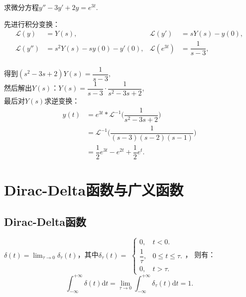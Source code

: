 \documentclass[openany,oneside]{ctexbook}
\begin{document}
\begin{example}
    求微分方程$y''-3y'+2y=e^{3t}$.
\end{example}
\begin{solution}
    先进行积分变换：
    \begin{align*}
        \mathcal{L}(y)&=Y(s),
        & \mathcal{L}(y')&=sY(s)-y(0),\\
        \mathcal{L}(y'')&=s^2Y(s)-sy(0)-y'(0),
        & \mathcal{L}(e^{3t})&=\dfrac{1}{s-3},
    \end{align*}\\
    得到$(s^2-3s+2)Y(s)=\dfrac{1}{s-3},$\\
    然后解出$Y(s)$：$Y(s)=\dfrac{1}{s-3}\cdot\dfrac{1}{s^2-3s+2}$,\\
    最后对$Y(s)$求逆变换：
    \begin{align*}
        y(t)&=e^{3t}*\mathcal{L}^{-1}\biggl(\dfrac{1}{s^2-3s+2}\biggr)\\
        &=\mathcal{L}^{-1}\biggl(\dfrac{1}{(s-3)(s-2)(s-1)}\biggr)\\
        &=\dfrac{1}{2}e^{3t}-e^{2t}+\dfrac{1}{2}e^t.
    \end{align*}
\end{solution}


\section{Dirac-Delta函数与广义函数}
\subsection{Dirac-Delta函数}
\begin{minipage}[t]{0.7\textwidth}
$\delta(t)=\lim_{\tau\to0}\delta_\tau(t)$，其中$\delta_\tau(t)=$
$\begin{cases}
    0, & t<0.\\
    \dfrac{1}{\tau}, & 0\leq t\leq\tau.\\
    0, & t>\tau.
\end{cases}$，
则有：
\[\displaystyle\int_{-\infty}^{+\infty}\delta(t)\mathrm{d}t=\lim_{\tau\to0}\int_{-\infty}^{+\infty}\delta_\tau(t)\mathrm{d}t=1.\]
\end{minipage}
\begin{minipage}[t]{0.3\textwidth}
    \begin{center}
    \end{center}
\end{minipage}
\end{document}
